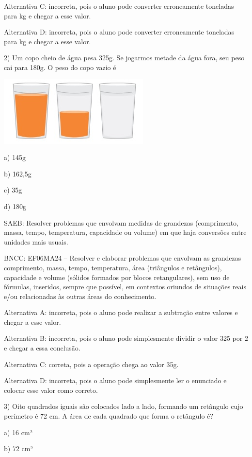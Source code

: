 Alternativa C: incorreta, pois o aluno pode converter erroneamente
toneladas para kg e chegar a esse valor.

Alternativa D: incorreta, pois o aluno pode converter erroneamente
toneladas para kg e chegar a esse valor.

2) Um copo cheio de água pesa 325g. Se jogarmos metade da água fora, seu
peso cai para 180g. O peso do copo vazio é

\includegraphics[width=2.98958in,height=1.38542in]{./imgSAEB_6_MAT/media/image100.png}

a) 145g

b) 162,5g

c) 35g

d) 180g

SAEB: Resolver problemas que envolvam medidas de grandezas (comprimento,
massa, tempo, temperatura, capacidade ou volume) em que haja conversões
entre unidades mais usuais.

BNCC: EF06MA24 -- Resolver e elaborar problemas que envolvam as
grandezas comprimento, massa, tempo, temperatura, área (triângulos e
retângulos), capacidade e volume (sólidos formados por blocos
retangulares), sem uso de fórmulas, inseridos, sempre que possível, em
contextos oriundos de situações reais e/ou relacionadas às outras áreas
do conhecimento.

Alternativa A: incorreta, pois o aluno pode realizar a subtração entre
valores e chegar a esse valor.

Alternativa B: incorreta, pois o aluno pode simplesmente dividir o valor
325 por 2 e chegar a essa conclusão.

Alternativa C: correta, pois a operação chega ao valor 35g.

Alternativa D: incorreta, pois o aluno pode simplesmente ler o enunciado
e colocar esse valor como correto.

3) Oito quadrados iguais são colocados lado a lado, formando um
retângulo cujo perímetro é 72 cm. A área de cada quadrado que forma o
retângulo é?

a) 16 cm²

b) 72 cm²

